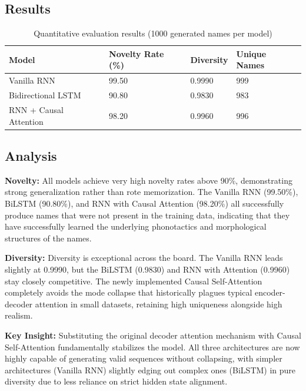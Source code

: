 \documentclass[11pt,a4paper]{article}
\begin{document}
\subsection{Results}
\begin{table}[H]
\centering
\caption{Quantitative evaluation results (1000 generated names per model)}
\renewcommand{\arraystretch}{1.3}
\begin{tabularx}{\textwidth}{lXXX}
\toprule
\textbf{Model} & \textbf{Novelty Rate (\%)} & \textbf{Diversity} & \textbf{Unique Names} \\
\midrule
Vanilla RNN            & 99.50 & 0.9990 & 999 \\
Bidirectional LSTM     & 90.80 & 0.9830 & 983 \\
RNN + Causal Attention & 98.20 & 0.9960 & 996 \\
\bottomrule
\end{tabularx}
\end{table}

\subsection{Analysis}

\textbf{Novelty:} All models achieve very high novelty rates above 90\%, demonstrating strong generalization rather than rote memorization. The Vanilla RNN (99.50\%), BiLSTM (90.80\%), and RNN with Causal Attention (98.20\%) all successfully produce names that were not present in the training data, indicating that they have successfully learned the underlying phonotactics and morphological structures of the names.

\textbf{Diversity:} Diversity is exceptional across the board. The Vanilla RNN leads slightly at 0.9990, but the BiLSTM (0.9830) and RNN with Attention (0.9960) stay closely competitive. The newly implemented Causal Self-Attention completely avoids the mode collapse that historically plagues typical encoder-decoder attention in small datasets, retaining high uniqueness alongside high realism.

\textbf{Key Insight:} Substituting the original decoder attention mechanism with Causal Self-Attention fundamentally stabilizes the model. All three architectures are now highly capable of generating valid sequences without collapsing, with simpler architectures (Vanilla RNN) slightly edging out complex ones (BiLSTM) in pure diversity due to less reliance on strict hidden state alignment.

\end{document}

